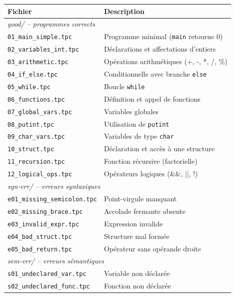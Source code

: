 \documentclass[12pt,a4paper]{article}
\begin{document}
\begin{longtable}{lp{8cm}}
\toprule
\textbf{Fichier} & \textbf{Description} \\
\midrule
\endhead
\multicolumn{2}{l}{\textit{good/ – programmes corrects}} \\
\midrule
\texttt{01\_main\_simple.tpc}     & Programme minimal (\texttt{main} retourne 0) \\
\texttt{02\_variables\_int.tpc}   & Déclarations et affectations d'entiers \\
\texttt{03\_arithmetic.tpc}       & Opérations arithmétiques (+, -, *, /, \%) \\
\texttt{04\_if\_else.tpc}         & Conditionnelle avec branche \texttt{else} \\
\texttt{05\_while.tpc}            & Boucle \texttt{while} \\
\texttt{06\_functions.tpc}        & Définition et appel de fonctions \\
\texttt{07\_global\_vars.tpc}     & Variables globales \\
\texttt{08\_putint.tpc}           & Utilisation de \texttt{putint} \\
\texttt{09\_char\_vars.tpc}       & Variables de type \texttt{char} \\
\texttt{10\_struct.tpc}           & Déclaration et accès à une structure \\
\texttt{11\_recursion.tpc}        & Fonction récursive (factorielle) \\
\texttt{12\_logical\_ops.tpc}     & Opérateurs logiques (\&\&, ||, !) \\
\midrule
\multicolumn{2}{l}{\textit{syn-err/ – erreurs syntaxiques}} \\
\midrule
\texttt{e01\_missing\_semicolon.tpc} & Point-virgule manquant \\
\texttt{e02\_missing\_brace.tpc}     & Accolade fermante absente \\
\texttt{e03\_invalid\_expr.tpc}      & Expression invalide \\
\texttt{e04\_bad\_struct.tpc}        & Structure mal formée \\
\texttt{e05\_bad\_return.tpc}        & Opérateur sans opérande droite \\
\midrule
\multicolumn{2}{l}{\textit{sem-err/ – erreurs sémantiques}} \\
\midrule
\texttt{s01\_undeclared\_var.tpc}      & Variable non déclarée \\
\texttt{s02\_undeclared\_func.tpc}     & Fonction non déclarée \\

\end{longtable}
\end{document}
